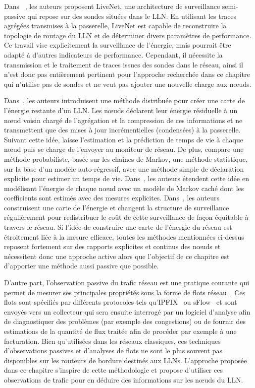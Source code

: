 Dans ~\cite{Chen:2008im}, les auteurs proposent LiveNet, une architecture de surveillance semi-passive  qui repose sur des sondes situées dans le \ac{LLN}.
En utilisant les traces agrégées transmises à la passerelle, LiveNet est capable de reconstruire la topologie de routage du \ac{LLN} et de déterminer divers paramètres de performance.
Ce travail vise explicitement la surveillance de l'énergie, mais pourrait être adapté à d'autres indicateurs de performance.
Cependant, il nécessite la transmission et le traitement de traces issues des sondes dans le réseau, ainsi il n'est donc pas entièrement pertinent pour l'approche recherchée dans ce chapitre qui n'utilise pas de sondes et ne veut pas ajouter une nouvelle charge aux nœuds.

Dans~\cite{Zhao:2002df}, les auteurs introduisent une méthode distribuée pour créer une carte de l'énergie restante d'un \ac{LLN}.
Les nœuds déclarent leur énergie résiduelle à un nœud voisin chargé de l'agrégation et la compression de ces informations et ne transmettent que des mises à jour incrémentielles (condensées) à la passerelle.
Suivant cette idée, \cite{Mini:2004zj} laisse l'estimation et la prédiction de temps de vie à chaque nœud puis se charge de l'envoyer au moniteur de réseau.
De plus, \cite{Mini:2004zj} compare une méthode probabiliste, basée sur les chaînes de Markov, une méthode statistique, sur la base d'un modèle auto-régressif, avec une  méthode simple de déclaration explicite pour estimer un temps de vie.
Dans~\cite{Hu:2007tb}, les auteurs étendent cette idée en modélisant l'énergie de chaque nœud avec un modèle de Markov caché dont les coefficients sont estimés avec des mesures explicites.
Dans~\cite{Chan:2009hl}, les auteurs construisent une carte de l'énergie et changent la structure de surveillance régulièrement pour redistribuer le coût de cette surveillance de façon équitable à travers le réseau.
Si l'idée de construire une carte de l'énergie du réseau est étroitement liée à la mesure efficace, toutes les méthodes mentionnées ci-dessus reposent fortement sur des rapports  explicites et continus des nœuds et nécessitent donc une approche active alors que l'objectif de ce chapitre est d'apporter une méthode aussi passive que possible.

D'autre part, l'observation passive du trafic réseau est une pratique courante qui permet de mesurer ses principales propriétés sous la forme de flots réseau~\cite{rfc7799}.
Ces flots sont spécifiés par différents protocoles tels qu'IPFIX~\cite{rfc7011} ou sFlow~\cite{phaal2001inmon} et sont envoyés vers un collecteur qui sera ensuite interrogé par un logiciel d'analyse afin de diagnostiquer des problèmes (par exemple des congestions) ou de fournir des estimations de la quantité de flux traitée afin de procéder par exemple à une facturation.
Bien qu'utilisées dans les réseaux classiques, ces techniques d'observations passives et d'analyses de flots ne sont le plus souvent pas disponibles sur les routeurs de bordure destinés aux \ac{LLN}s.
L'approche proposée dans ce chapitre s'inspire de cette méthodologie et propose d'utiliser ces observations de trafic pour en déduire des informations sur les nœuds du \ac{LLN}.

